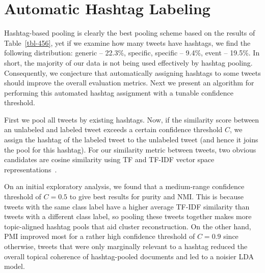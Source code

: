 \documentclass{sig-alternate}
\newcommand{\secmoveup}{\vspace{-1.mm}}
\begin{document}
\secmoveup
\section{Automatic Hashtag Labeling}

Hashtag-based pooling is clearly the best pooling scheme based on the
results of Table~\ref{tbl-456}, yet if we examine how many tweets have
hashtags, we find the following distribution: generic -- 22.3\%,
specific, specific -- 9.4\%, event -- 19.5\%.  In short, the majority
of our data is not being used effectively by hashtag pooling.
Consequently, we conjecture that automatically assigning hashtags to
some tweets should improve the overall evaluation metrics.
Next we present an algorithm for performing this automated hashtag
assignment with a tunable confidence threshold.

\vspace{1mm}  First we pool
all tweets by existing hashtags.  Now, if the similarity score between
an unlabeled and labeled tweet exceeds a certain confidence threshold
$C$, we assign the hashtag of the labeled tweet to the unlabeled tweet
(and hence it joins the pool for this hashtag).  For our similarity
metric between tweets, two obvious candidates are cosine similarity
using TF and TF-IDF vector space representations~\cite{salton83Introduction}.  

On an initial exploratory analysis, we found that a medium-range
confidence threshold of $C=0.5$ to give best results for purity and NMI. 
This is because tweets with the same class label have a higher average TF-IDF
similarity than tweets with a different class label, so pooling
these tweets together makes more topic-aligned hashtag pools that aid
cluster reconstruction.  On the other hand, PMI improved most for a
rather high confidence threshold of $C=0.9$ since otherwise, tweets
that were only marginally relevant to a hashtag reduced the overall
topical coherence of hashtag-pooled documents and led to a noisier LDA
model.
\end{document}
